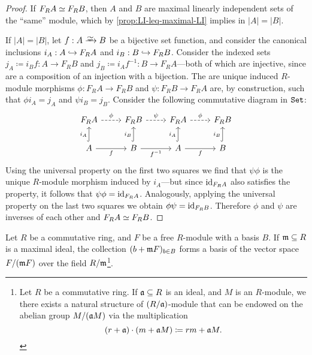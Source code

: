 \begin{proof}
If \(F_R A \simeq F_R B\), then \(A\) and \(B\) are maximal linearly independent
sets of the ``same'' module, which by \cref{prop:LI-leq-maximal-LI} implies in
\(|A| = |B|\).

If \(|A| = |B|\), let \(f: A \isoto B\) be a bijective set function, and
consider the canonical inclusions \(i_A: A \hookrightarrow F_R A\) and
\(i_B: B \hookrightarrow F_R B\). Consider the indexed sets
\(j_A \coloneq i_B f: A \to F_R B\) and
\(j_B \coloneq i_A f^{-1}: B \to F_R A\)---both of which are injective, since
are a composition of an injection with a bijection. The are unique induced
\(R\)-module morphisms \(\phi: F_R A \to F_R B\) and \(\psi: F_R B \to F_R A\)
are, by construction, such that \(\phi i_A = j_A\) and \(\psi i_B =
j_B\). Consider the following commutative diagram in \({\texttt{Set}}\):
\[
\begin{tikzcd}
F_R A \ar[r, dashed, "\phi"]
&F_R B \ar[r, dashed, "\psi"]
&F_R A \ar[r, dashed, "\phi"]
&F_R B
\\
A \ar[u, hook, "i_A"] \ar[r, "f"']
&B \ar[u, hook, "i_B"] \ar[r, "f^{-1}"']
&A \ar[u, hook, "i_A"] \ar[r, "f"']
&B \ar[u, hook, "i_B"]
\end{tikzcd}
\]
Using the universal property on the first two squares we find that \(\psi \phi\)
is the unique \(R\)-module morphism induced by \(i_A\)---but since
\(\operatorname{id}_{F_R A}\) also satisfies the property, it follows that
\(\psi \phi = \operatorname{id}_{F_R A}\). Analogously, applying the universal property on the
last two squares we obtain \(\phi \psi = \operatorname{id}_{F_R B}\). Therefore \(\phi\) and
\(\psi\) are inverses of each other and \(F_R A \simeq F_R B\).
\end{proof}

\begin{lemma}
\label{lem:basis-free-to-basis-vector-space}
Let \(R\) be a commutative ring, and \(F\) be a free \(R\)-module with a basis
\(B\). If \(\mathfrak{m} \subseteq R\) is a maximal ideal, the collection
\((b + \mathfrak{m} F)_{b \in B}\) forms a basis of the vector space
\(F/(\mathfrak{m} F)\) over the field \(R/\mathfrak{m}\)\footnote{Let \(R\) be a
  commutative ring. If \(\mathfrak{a} \subseteq R\) is an ideal, and \(M\) is an
  \(R\)-module, we there exists a natural structure of \((R/{\mathfrak{a}})\)-module
  that can be endowed on the abelian group \(M/(\mathfrak{a} M)\) via the
  multiplication
  \[
  (r + \mathfrak{a}) \cdot (m + \mathfrak{a} M) \coloneq r m + \mathfrak{a} M.
  \]
}.
\end{lemma}

